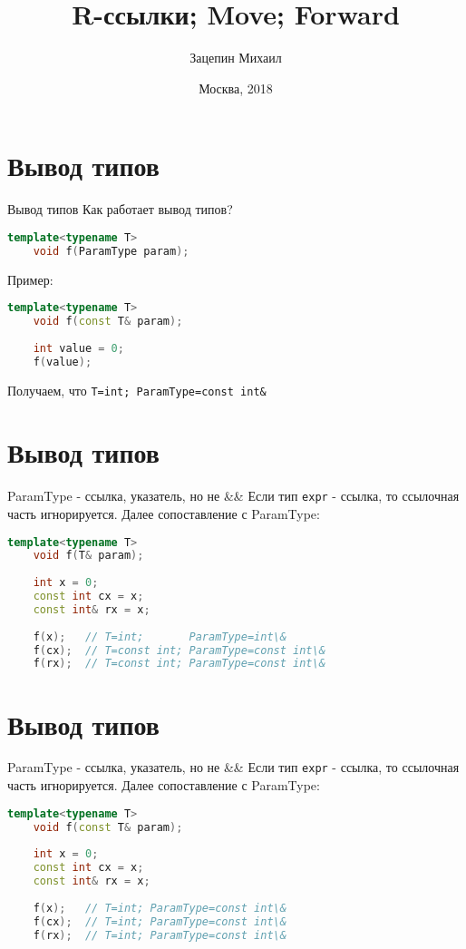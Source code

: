 \documentclass[10pt]{beamer}
\title[\href{https://goo.gl/NRgp8K}{https://goo.gl/NRgp8K} (Term 3)]{R-ссылки; Move; Forward}
\author[Зацепин Михаил]{Зацепин Михаил}
\institute[МФТИ] 
{Московский физико-технический институт\\*}
\date{Москва, 2018}
\begin{document}
\begin{frame}
  \titlepage
\end{frame}

\section{Вывод типов}
\begin{frame}[fragile]{Вывод типов}
Как работает вывод типов?
\begin{lstlisting}[language=C++]
    template<typename T>
    void f(ParamType param);
\end{lstlisting}
\pause
Пример:
\begin{lstlisting}[language=C++]
    template<typename T>
    void f(const T& param);
    
    int value = 0;
    f(value);
\end{lstlisting}
\pause
Получаем, что \texttt{T=int; ParamType=const int\&}
\end{frame}

\section{Вывод типов}
\begin{frame}[fragile]{ParamType - ссылка, указатель, но не \&\&}
Если тип \texttt{expr} - ссылка, то ссылочная часть игнорируется. Далее сопоставление с ParamType:

\begin{lstlisting}[language=C++]
    template<typename T>
    void f(T& param);
    
    int x = 0;
    const int cx = x;
    const int& rx = x;
    
    f(x);   // T=int;       ParamType=int\&
    f(cx);  // T=const int; ParamType=const int\&
    f(rx);  // T=const int; ParamType=const int\&
\end{lstlisting}
\end{frame}

\section{Вывод типов}
\begin{frame}[fragile]{ParamType - ссылка, указатель, но не \&\&}
Если тип \texttt{expr} - ссылка, то ссылочная часть игнорируется. Далее сопоставление с ParamType:

\begin{lstlisting}[language=C++]
    template<typename T>
    void f(const T& param);
    
    int x = 0;
    const int cx = x;
    const int& rx = x;
    
    f(x);   // T=int; ParamType=const int\&
    f(cx);  // T=int; ParamType=const int\&
    f(rx);  // T=int; ParamType=const int\&
\end{lstlisting}
\end{frame}
\end{document}
